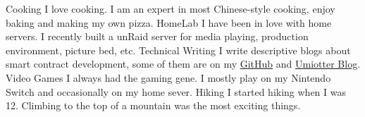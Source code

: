 



\begin{cvskills}
  \cvskill
    {Cooking} %
    {I love cooking. I am an expert in most Chinese-style cooking, enjoy baking and making my own pizza.} %
  \cvskill
    {HomeLab} %
    {I have been in love with home servers. I recently built a unRaid server for media playing, production environment, picture bed, etc.} %
  \cvskill
    {Technical Writing} %
    {I write descriptive blogs about smart contract development, some of them are on my \href{https://github.com/umiotter/}{GitHub} and \href{https://umiotter.com}{Umiotter Blog}.} %
  \cvskill
    {Video Games} %
    {I always had the gaming gene. I mostly play on my Nintendo Switch and occasionally on my home sever.} %
  \cvskill
    {Hiking} %
    {I started hiking when I was 12. Climbing to the top of a mountain was the most exciting things.} %

\end{cvskills}